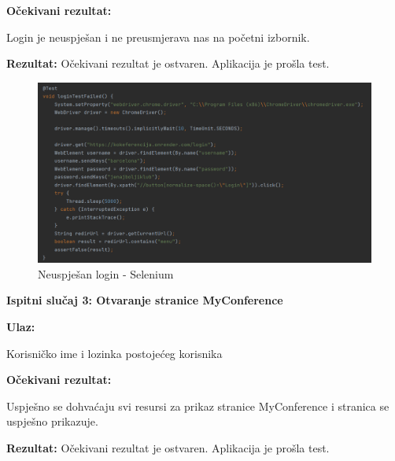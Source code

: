    \textbf{Očekivani rezultat:}
   \begin{packed_item}
   \item[] \begin{packed_enum}
				
				\item Login je neuspješan i ne preusmjerava nas na početni izbornik. 
				
			\end{packed_enum}
   \end{packed_item}
   \textbf{Rezultat:} \text Očekivani rezultat je ostvaren. \color{red} Aplikacija je prošla test. \color{black}

    \begin{figure}[H]
            \includegraphics[width = \textwidth]{slike/login failed.png}
			
			\centering
			\caption{Neuspješan login - Selenium}
			\label{fig:neuspjesan login selenium}
			\end{figure}

   \eject

   \textbf{Ispitni slučaj 3: Otvaranje stranice MyConference\newline}

  \newLine
   
   \textbf{Ulaz:}
   \begin{packed_item}
            \item Korisničko ime i lozinka postojećeg korisnika
   \end{packed_item}

   \textbf{Očekivani rezultat:}
   \begin{packed_item}
   \item[] \begin{packed_enum}
				
				\item Uspješno se dohvaćaju svi resursi za prikaz stranice MyConference i stranica se uspješno prikazuje. 
				
			\end{packed_enum}
   \end{packed_item}
   \textbf{Rezultat:} \text Očekivani rezultat je ostvaren. \color{red} Aplikacija je prošla test. \color{black}

